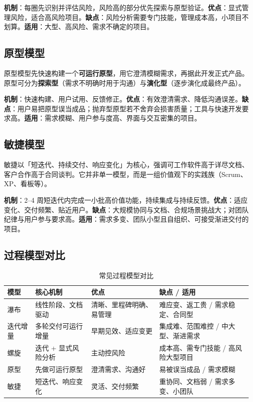 \noindent\textbf{机制}：每圈先识别并评估风险，风险高的部分优先探索与原型验证。\textbf{优点}：显式管理风险，适合高风险项目。\textbf{缺点}：风险分析需要专门技能，管理成本高，小项目不划算。\textbf{适用}：大型、高风险、需求不确定的项目。

\subsection{原型模型}

原型模型先快速构建一个\textbf{可运行原型}，用它澄清模糊需求，再据此开发正式产品。原型可分为\textbf{探索型}（需求不明确时用于沟通）与\textbf{演化型}（逐步演化成最终产品）。

\noindent\textbf{机制}：快速构建、用户试用、反馈修正。\textbf{优点}：有效澄清需求、降低沟通误差。\textbf{缺点}：用户易把原型误当成品；抛弃型原型若不舍弃会损害质量；工具与快速开发要求高。\textbf{适用}：需求模糊、用户参与度高、界面与交互密集的项目。

\subsection{敏捷模型}

敏捷以「短迭代、持续交付、响应变化」为核心，强调可工作软件高于详尽文档、客户合作高于合同谈判。它并非单一模型，而是一组价值观下的实践族（Scrum、XP、看板等）。

\noindent\textbf{机制}：2--4 周短迭代内完成一小批高价值功能，持续集成与持续反馈。\textbf{优点}：适应变化、交付频繁、贴近用户。\textbf{缺点}：大规模协同与文档、合规场景挑战大；对团队纪律与用户参与要求高。\textbf{适用}：需求多变、团队小型且自组织、可接受渐进交付的项目。

\subsection{过程模型对比}

\begin{table}[H]
\centering
\caption{常见过程模型对比}
\begin{tabulary}{\textwidth}{LLLL}
\toprule
模型 & 核心机制 & 优点 & 缺点 / 适用 \\
\midrule
瀑布 & 线性阶段、文档驱动 & 清晰、里程碑明确、易管理 & 难应变、返工贵 / 需求稳定、合同型 \\
迭代增量 & 多轮交付可运行增量 & 早期见效、适应变更 & 集成难、范围难控 / 中大型、渐进需求 \\
螺旋 & 迭代 + 显式风险分析 & 主动控风险 & 成本高、需专门技能 / 高风险大型项目 \\
原型 & 先做可运行原型 & 澄清需求、沟通好 & 易被误当成品 / 需求模糊 \\
敏捷 & 短迭代、响应变化 & 灵活、交付频繁 & 重协同、文档弱 / 需求多变、小团队 \\
\bottomrule
\end{tabulary}
\end{table}

